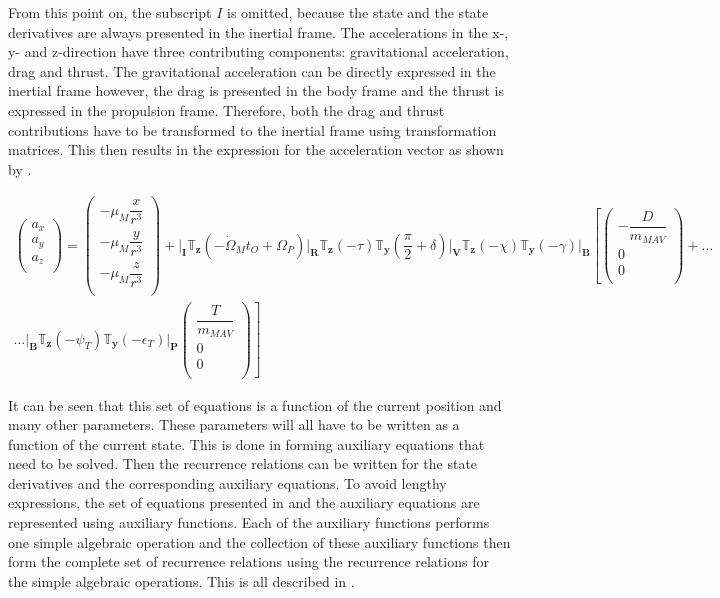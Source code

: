 From this point on, the subscript $I$ is omitted, because the state and the state derivatives are always presented in the inertial frame. The accelerations in the x-, y- and z-direction have three contributing components: gravitational acceleration, drag and thrust. The gravitational acceleration can be directly expressed in the inertial frame however, the drag is presented in the body frame and the thrust is expressed in the propulsion frame. Therefore, both the drag and thrust contributions have to be transformed to the inertial frame using transformation matrices. This then results in the expression for the acceleration vector as shown by .

\begin{multline} \label{eq:acc}
\begin{pmatrix}
a_{x}\\
a_{y}\\
a_{z}\\
\end{pmatrix}
=
\begin{pmatrix}
-\mu_{M}\dfrac{x}{r^{3}}\\
-\mu_{M}\dfrac{y}{r^{3}}\\
-\mu_{M}\dfrac{z}{r^{3}}\\
\end{pmatrix}+
\Bigg|_{\mathbf{I}}\mathbb{T}_{\mathbf{z}}\left(-\dot{\Omega}_{M}t_{O}+\Omega_{P}\right)\Bigg|_{\mathbf{R}}\mathbb{T}_{\mathbf{z}}\left(-\tau\right)\mathbb{T}_{\mathbf{y}}\left(\dfrac{\pi}{2}+\delta\right)\Bigg|_{\mathbf{V}}\mathbb{T}_{\mathbf{z}}\left(-\chi\right)\mathbb{T}_{\mathbf{y}}\left(-\gamma\right)\Bigg|_{\mathbf{B}}\left[
\begin{pmatrix}
-\dfrac{D}{m_{MAV}}\\
0\\
0\\
\end{pmatrix}
+  \right. \dots \\
\dotsc
 \left.
\Bigg|_{\mathbf{B}}\mathbb{T}_{\mathbf{z}}\left(-\psi_{T}\right)\mathbb{T}_{\mathbf{y}}\left(-\epsilon_{T}\right)\Bigg|_{\mathbf{P}}
\begin{pmatrix}
\dfrac{T}{m_{MAV}}\\
0\\
0\\
\end{pmatrix}
\right]
\end{multline}

It can be seen that this set of equations is a function of the current position and many other parameters. These parameters will all have to be written as a function of the current state. This is done in  forming auxiliary equations that need to be solved. Then the recurrence relations can be written for the state derivatives and the corresponding auxiliary equations. To avoid lengthy expressions, the set of equations presented in  and the auxiliary equations are represented using auxiliary functions. Each of the auxiliary functions performs one simple algebraic operation and the collection of these auxiliary functions then form the complete set of recurrence relations using the recurrence relations for the simple algebraic operations. This is all described in . 


